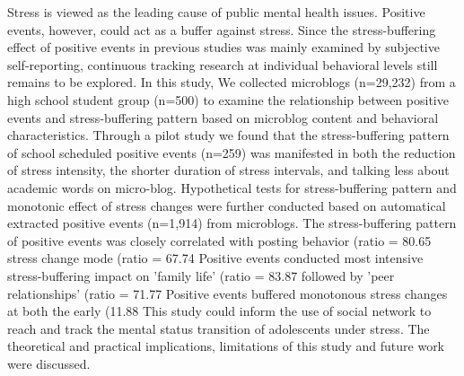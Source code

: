 Stress is viewed as the leading cause of public mental health issues.
Positive events, however, could act as a buffer against stress.
Since the stress-buffering effect of positive events in previous studies was mainly examined
by subjective self-reporting,
continuous tracking research at individual behavioral levels still remains to be explored.
In this study,
We collected microblogs (n=29,232) from a high school student group (n=500) to examine the relationship
between positive events and stress-buffering pattern based on microblog content and behavioral characteristics.
Through a pilot study we found that the stress-buffering pattern of school scheduled positive events (n=259)
was manifested in both the reduction of stress intensity,
the shorter duration of stress intervals,
and talking less about academic words on micro-blog.
Hypothetical tests for stress-buffering pattern and monotonic effect of stress changes
were further conducted based on automatical extracted positive events (n=1,914) from microblogs.
The stress-buffering pattern of positive events
was closely correlated with posting behavior (ratio = 80.65%
stress change mode (ratio = 67.74%
Positive events conducted most intensive stress-buffering impact on 'family life' (ratio = 83.87%
followed by 'peer relationships' (ratio = 71.77%
Positive events buffered monotonous stress changes at both the early (11.88%
This study could inform the use of social network to reach and track the mental status transition of adolescents under stress.
The theoretical and practical implications, limitations of this study and future work were discussed.